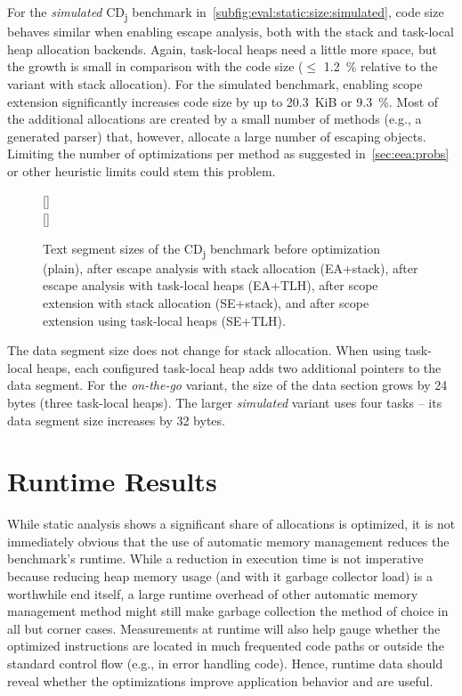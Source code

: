 		For the \emph{simulated} CD\textsubscript{j} benchmark in~\cref{subfig:eval:static:size:simulated}, code size
		behaves similar when enabling escape analysis, both with the stack and task-local heap allocation backends. Again,
		task-local heaps need a little more space, but the growth is small in comparison with the code size ($\le$ 1.2~\%
		relative to the variant with stack allocation). For the simulated benchmark, enabling scope extension significantly
		increases code size by up to 20.3~KiB or 9.3~\%. Most of the additional allocations are created by a small number of
		methods (e.g., a generated parser) that, however, allocate a large number of escaping objects. Limiting the number
		of optimizations per method as suggested in~\cref{sec:eea:probs} or other heuristic limits could stem this problem.

		\begin{figure}
			\centering
			[\textwidth]{%
				\centering%
			}\\[2ex]
			[\textwidth]{%
				\centering%
			}%
			\caption[CD\textsubscript{j} text segment sizes]{%
				Text segment sizes of the CD\textsubscript{j} benchmark before optimization (plain), after escape analysis with
				stack allocation (EA+stack), after escape analysis with task-local heaps (EA+TLH), after scope extension with
				stack allocation (SE+stack), and after scope extension using task-local heaps (SE+TLH).}%
			\label{fig:eval:static:size}
		\end{figure}

		The data segment size does not change for stack allocation. When using task-local heaps, each configured task-local
		heap adds two additional pointers to the data segment. For the \emph{on-the-go} variant, the size of the data
		section grows by 24 bytes (three task-local heaps). The larger \emph{simulated} variant uses four tasks – its data
		segment size increases by 32 bytes.

	\section{Runtime Results}
		\label{sec:eval:runtime}
		While static analysis shows a significant share of allocations is optimized, it is not immediately obvious that the
		use of automatic memory management reduces the benchmark's runtime. While a reduction in execution time is not
		imperative because reducing heap memory usage (and with it garbage collector load) is a worthwhile end itself,
		a large runtime overhead of other automatic memory management method might still make garbage collection the method
		of choice in all but corner cases. Measurements at runtime will also help gauge whether the optimized instructions
		are located in much frequented code paths or outside the standard control flow (e.g., in error handling code).
		Hence, runtime data should reveal whether the optimizations improve application behavior and are useful.

